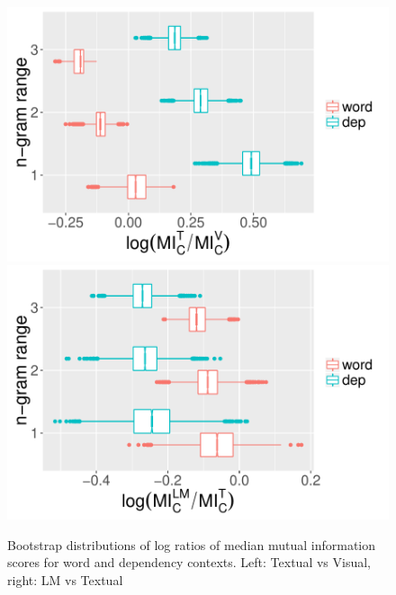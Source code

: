 \begin{figure}
  \centering
  \includegraphics[scale=0.4]{bootstrappedMI.pdf}
  \includegraphics[scale=0.4]{bootstrappedMI2.pdf}
  \caption{Bootstrap distributions of log ratios of median mutual
    information scores for word and dependency contexts. Left: {\sc Textual}
      vs {\sc Visual}, right: {\sc LM} vs {\sc Textual}}
  \label{fig:mi-boot}
  \vspace{-.2cm}
\end{figure}



